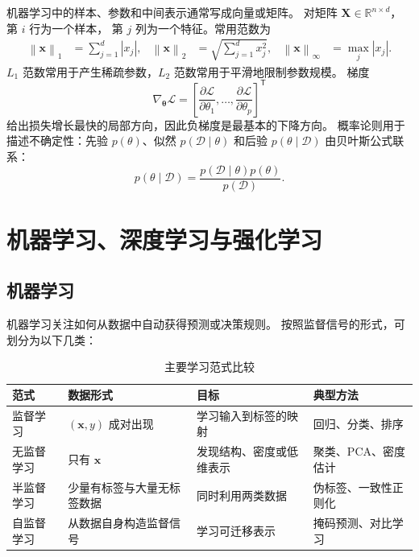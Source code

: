 \documentclass[UTF8,zihao=-4,a4paper,fontset=windows]{ctexart}
\newcommand{\R}{\mathbb{R}}
\newcommand{\norm}[1]{\left\lVert #1\right\rVert}
\newcommand{\abs}[1]{\left|#1\right|}
\newcommand{\dataset}{\mathcal{D}}
\newcommand{\loss}{\mathcal{L}}
\begin{document}
机器学习中的样本、参数和中间表示通常写成向量或矩阵。
对矩阵 $\bm{X}\in\R^{n\times d}$，第 $i$ 行为一个样本，
第 $j$ 列为一个特征。常用范数为
\begin{align}
  \norm{\bm{x}}_1 &= \sum_{j=1}^{d}\abs{x_j}, &
  \norm{\bm{x}}_2 &= \sqrt{\sum_{j=1}^{d}x_j^2}, &
  \norm{\bm{x}}_\infty &= \max_j\abs{x_j}.
\end{align}
$L_1$ 范数常用于产生稀疏参数，$L_2$ 范数常用于平滑地限制参数规模。
梯度
\begin{equation}
  \nabla_{\bm{\theta}}\loss
  =\left[
  \frac{\partial\loss}{\partial\theta_1},
  \ldots,
  \frac{\partial\loss}{\partial\theta_p}
  \right]^{\mathsf T}
\end{equation}
给出损失增长最快的局部方向，因此负梯度是最基本的下降方向。
概率论则用于描述不确定性：先验 $p(\theta)$、似然 $p(\dataset\mid\theta)$
和后验 $p(\theta\mid\dataset)$ 由贝叶斯公式联系：
\begin{equation}
  p(\theta\mid\dataset)
  =\frac{p(\dataset\mid\theta)p(\theta)}{p(\dataset)}.
\end{equation}

\section{机器学习、深度学习与强化学习}

\subsection{机器学习}

机器学习关注如何从数据中自动获得预测或决策规则\cite{mitchell}。
按照监督信号的形式，可划分为以下几类：

\begin{table}[H]
\centering
\caption{主要学习范式比较}
\begin{tabularx}{\textwidth}{L{2.6cm}Y Y Y}
\toprule
\textbf{范式} & \textbf{数据形式} & \textbf{目标} & \textbf{典型方法}\\
\midrule
监督学习 & $(\bm{x},y)$ 成对出现 & 学习输入到标签的映射 & 回归、分类、排序\\
无监督学习 & 只有 $\bm{x}$ & 发现结构、密度或低维表示 & 聚类、PCA、密度估计\\
半监督学习 & 少量有标签与大量无标签数据 & 同时利用两类数据 & 伪标签、一致性正则化\\
自监督学习 & 从数据自身构造监督信号 & 学习可迁移表示 & 掩码预测、对比学习\\
\bottomrule
\end{tabularx}
\end{table}
\end{document}
